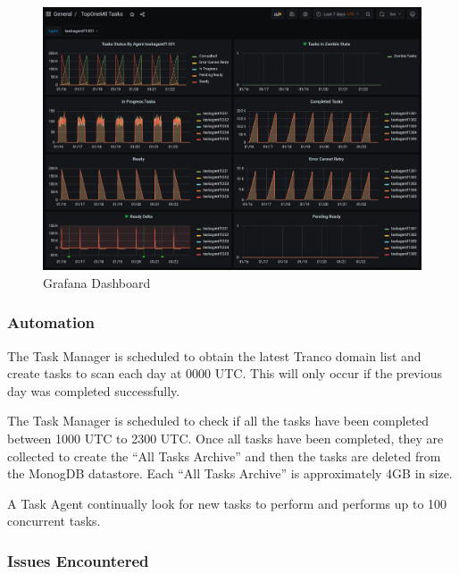 \documentclass{mscreport}
\begin{document}
\begin{figure}[ht]
	\begin{center}
		\includegraphics[scale=0.48]{../images/Grafana.png} 
		\caption{Grafana Dashboard}
		\label{fig:grafana_screenshot}
	\end{center}
\end{figure}

\noindent
\clearpage

\subsubsection{Automation}

The Task Manager is scheduled to obtain the latest Tranco domain list and create tasks to scan each day at 0000 UTC. This will only occur if the previous day was completed successfully.

\vspace{0.3cm} \noindent
The Task Manager is scheduled to check if all the tasks have been completed between 1000 UTC to 2300 UTC. Once all tasks have been completed, they are collected to create the ``All Tasks Archive'' and then the tasks are deleted from the MonogDB datastore. Each ``All Tasks Archive'' is approximately 4GB in size.

\vspace{0.3cm} \noindent
A Task Agent continually look for new tasks to perform and performs up to 100 concurrent tasks.

\subsubsection{Issues Encountered}
\label{subsection:issues_encountered}
\end{document}
